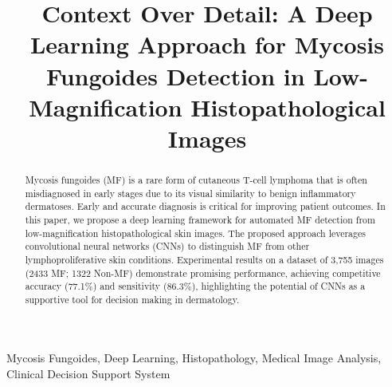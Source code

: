 \documentclass[conference]{IEEEtran}
\begin{document}
\title{Context Over Detail: A Deep Learning Approach for Mycosis Fungoides Detection in Low-Magnification Histopathological Images
}

\author{
\vspace{0.15cm} %
\vspace{0.1cm}
}

\maketitle

\begin{abstract}
Mycosis fungoides (MF) is a rare form of cutaneous T-cell lymphoma that is often misdiagnosed in early stages due to 
its visual similarity to benign inflammatory dermatoses. Early and accurate diagnosis is critical for improving patient outcomes. 
In this paper, we propose a deep learning framework for automated MF detection from low-magnification histopathological skin images. 
The proposed approach leverages convolutional neural networks (CNNs) to distinguish MF from other lymphoproliferative skin conditions. 
Experimental results on a dataset of 3,755 images (2433 MF; 1322 Non-MF) demonstrate promising performance, 
achieving competitive accuracy (77.1\%) and sensitivity (86.3\%), highlighting the potential of CNNs as a supportive tool for 
decision making in dermatology.
\end{abstract}

\begin{IEEEkeywords}
Mycosis Fungoides, Deep Learning, Histopathology, Medical Image Analysis, Clinical Decision Support System
\end{IEEEkeywords}
\end{document}
